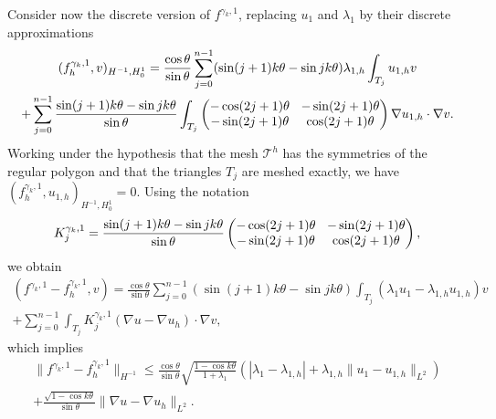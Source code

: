 \documentclass[11pt]{article}
\numberwithin{equation}{section}\newtheorem*{jepEnonce}{\jepEnonceTitle}\newenvironment{enonce*}[1]{\def\jepEnonceTitle{#1}\jepEnonce}{\endjepEnonce}\newtheorem*{conj*}{Conjecture}
\newcommand{\colsep}{\arraycolsep4.5pt}
\theoremstyle{plain}
\theoremstyle{definition}
\begin{document}
Consider now the discrete version of $f^{\gamma_k,1}$, replacing $u_1$ and $\lambda_1$ by their discrete approximations
\vspace*{-5pt}
\begin{multline*}
(f_h^{\gamma_k,1},v)_{H^{-1},H_0^1} = \frac{\cos \theta}{\sin \theta}\sum_{j=0}^{n-1} (\sin(j+1)k\theta-\sin jk\theta) \lambda_{1,h} \int_{T_j} u_{1,h}v\\\colsep
+ \sum_{j=0}^{n-1} \frac{\sin(j+1)k\theta-\sin jk\theta}{\sin \theta} \int_{T_j}\begin{pmatrix}
-\cos (2j+1)\theta & -\sin (2j+1) \theta \\
-\sin (2j+1)\theta & \cos (2j+1)\theta
\end{pmatrix}\nabla u_{1,h} \cdot \nabla v.
\end{multline*}
Working under the hypothesis that the mesh $\mathcal T^h$ has the symmetries of the regular polygon and that the triangles $T_j$ are meshed exactly, we have $(f_h^{\gamma_k,1},u_{1,h})_{H^{-1},H_0^1} = 0$. Using the notation
\[\colsep
K_j^{\gamma_k,1} = \frac{\sin(j+1)k\theta-\sin jk\theta}{\sin \theta} \begin{pmatrix}
-\cos (2j+1)\theta & -\sin (2j+1) \theta \\
-\sin(2j+1)\theta & \cos (2j+1)\theta
\end{pmatrix},
\]
we obtain
\vspace*{-5pt}
\begin{multline*}
(f^{\gamma_k,1}-f^{\gamma_k,1}_h,v) = \frac{\cos \theta}{\sin \theta}\sum_{j=0}^{n-1} (\sin (j+1)k\theta-\sin jk\theta) \int_{T_j}(\lambda_1 u_1-\lambda_{1,h}u_{1,h})v\\
+ \sum_{j=0}^{n-1} \int_{T_j}K_j^{\gamma_k,1}(\nabla u - \nabla u_h)\cdot \nabla v,
\end{multline*}
which implies
\vspace*{-5pt}
\begin{multline*}
\|f^{\gamma_k,1}-f_h^{\gamma_k,1} \|_{H^{-1}} \leq \frac{\cos \theta}{\sin \theta} \sqrt{\frac{1-\cos k\theta}{1+\lambda_1}}(|\lambda_1-\lambda_{1,h}|+\lambda_{1,h}\|u_1-u_{1,h}\|_{L^2}) \\
+ \frac{\sqrt{1-\cos k\theta}}{\sin \theta} \|\nabla u-\nabla u_h\|_{L^2}.
\end{multline*}
\end{document}
